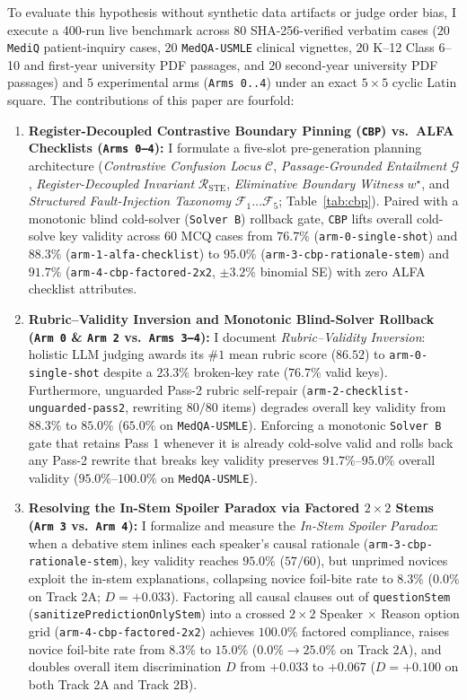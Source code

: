 \documentclass[11pt,a4paper]{article}
\begin{document}
To evaluate this hypothesis without synthetic data artifacts or judge order bias, I execute a 400-run live benchmark across $80$ SHA-256-verified verbatim cases ($20$ \texttt{MediQ} patient-inquiry cases, $20$ \texttt{MedQA-USMLE} clinical vignettes, $20$ K--12 Class 6--10 and first-year university PDF passages, and $20$ second-year university PDF passages) and $5$ experimental arms (\texttt{Arms 0..4}) under an exact $5\times 5$ cyclic Latin square. The contributions of this paper are fourfold:
\begin{enumerate}
  \item \textbf{Register-Decoupled Contrastive Boundary Pinning (\texttt{CBP}) vs.\ ALFA Checklists (\texttt{Arms 0--4}):} I formulate a five-slot pre-generation planning architecture (\emph{Contrastive Confusion Locus} $\mathcal{C}$, \emph{Passage-Grounded Entailment} $\mathcal{G}$, \emph{Register-Decoupled Invariant} $\mathcal{R}_{\text{STE}}$, \emph{Eliminative Boundary Witness} $w^\star$, and \emph{Structured Fault-Injection Taxonomy} $\mathcal{F}_1\dots\mathcal{F}_5$; Table~\ref{tab:cbp}). Paired with a monotonic blind cold-solver (\texttt{Solver B}) rollback gate, \texttt{CBP} lifts overall cold-solve key validity across $60$ MCQ cases from $76.7\%$ (\texttt{arm-0-single-shot}) and $88.3\%$ (\texttt{arm-1-alfa-checklist}) to $95.0\%$ (\texttt{arm-3-cbp-rationale-stem}) and $91.7\%$ (\texttt{arm-4-cbp-factored-2x2}, $\pm 3.2\%$ binomial SE) with zero ALFA checklist attributes.
  \item \textbf{Rubric--Validity Inversion and Monotonic Blind-Solver Rollback (\texttt{Arm 0} \& \texttt{Arm 2} vs.\ \texttt{Arms 3--4}):} I document \emph{Rubric--Validity Inversion}: holistic LLM judging awards its $\#1$ mean rubric score ($86.52$) to \texttt{arm-0-single-shot} despite a $23.3\%$ broken-key rate ($76.7\%$ valid keys). Furthermore, unguarded Pass-2 rubric self-repair (\texttt{arm-2-checklist-unguarded-pass2}, rewriting $80/80$ items) degrades overall key validity from $88.3\%$ to $85.0\%$ ($65.0\%$ on \texttt{MedQA-USMLE}). Enforcing a monotonic \texttt{Solver B} gate that retains Pass 1 whenever it is already cold-solve valid and rolls back any Pass-2 rewrite that breaks key validity preserves $91.7\%$--$95.0\%$ overall validity ($95.0\%$--$100.0\%$ on \texttt{MedQA-USMLE}).
  \item \textbf{Resolving the In-Stem Spoiler Paradox via Factored $2\times 2$ Stems (\texttt{Arm 3} vs.\ \texttt{Arm 4}):} I formalize and measure the \emph{In-Stem Spoiler Paradox}: when a debative stem inlines each speaker's causal rationale (\texttt{arm-3-cbp-rationale-stem}), key validity reaches $95.0\%$ ($57/60$), but unprimed novices exploit the in-stem explanations, collapsing novice foil-bite rate to $8.3\%$ ($0.0\%$ on Track 2A; $D = +0.033$). Factoring all causal clauses out of \texttt{questionStem} (\texttt{sanitizePredictionOnlyStem}) into a crossed $2\times 2$ Speaker $\times$ Reason option grid (\texttt{arm-4-cbp-factored-2x2}) achieves $100.0\%$ factored compliance, raises novice foil-bite rate from $8.3\%$ to $15.0\%$ ($0.0\% \to 25.0\%$ on Track 2A), and doubles overall item discrimination $D$ from $+0.033$ to $+0.067$ ($D = +0.100$ on both Track 2A and Track 2B).

\end{enumerate}
\end{document}

